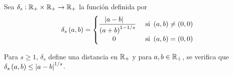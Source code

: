 Sea $\delta_{s}:\mathbb{R}_{+}\times\mathbb{R}_{+}\to\mathbb{R}_{+}$ la función definida por
\begin{align*}
\delta_{s}\left( a,b \right) = 
\begin{cases}
\dfrac{\left| a - b \right|\ \ \ }{\left( a + b \right)^{1-1/s}} & \text{ si } \left( a,b \right) \ne \left( 0,0 \right) \\
\qquad 0 &  \text{ si } \left( a,b \right) = \left( 0,0 \right)
\end{cases}
\end{align*}

\begin{lemma}
	Para $s\ge 1$, $\delta_{s}$ define una distancia en $\mathbb{R}_{+}$ y para $a,b\in\mathbb{R}_{+}$, se verifica que $\delta_{s}\left( a,b \right) \le \left| a-b \right|^{1/s}$.
\end{lemma}

